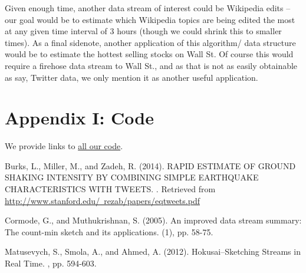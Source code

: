 \documentclass[twoside]{article}
\begin{document}
\begin{multicols}{2}
Given enough time, another data stream of interest could be Wikipedia edits -- our goal would be to estimate which Wikipedia topics are being edited the most at any given time interval of 3 hours (though we could shrink this to smaller times). As a final sidenote, another application of this algorithm/ data structure would be to estimate the hottest selling stocks on Wall St. Of course this would require a firehose data stream to Wall St., and as that is not as easily obtainable as say, Twitter data, we only mention it as another useful application.

\section{Appendix I: Code} \label{sec:Appendix_code}

We provide links to \href{https://github.com/kiranvodrahalli/cos521/}{all our code}.

\end{multicols}


\begin{thebibliography}{99} %


Burks, L., Miller, M., and Zadeh, R. (2014). 
\newblock RAPID ESTIMATE OF GROUND SHAKING INTENSITY BY COMBINING SIMPLE EARTHQUAKE CHARACTERISTICS WITH TWEETS. 
. Retrieved from \href{http://www.stanford.edu/~rezab/papers/eqtweets.pdf}{http://www.stanford.edu/~rezab/papers/eqtweets.pdf}

Cormode, G., and Muthukrishnan, S. (2005). 
\newblock An improved data stream summary: The count-min sketch and its applications. 
(1), pp. 58-75.

Matusevych, S., Smola, A., and Ahmed, A. (2012).
\newblock Hokusai--Sketching Streams in Real Time.
, pp. 594-603.


 
\end{thebibliography}

\end{document}

